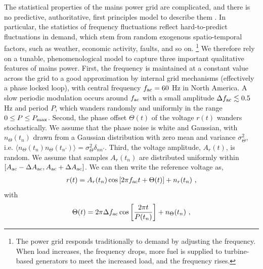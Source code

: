 \documentclass[pra,superscriptaddress,reprint,amsmath,amssymb,nofootinbib]{revtex4-2}
\begin{document}
 The statistical properties of the mains power grid are complicated, and there is no predictive, authoritative, first principles model to describe them \cite{888ed69a34a94bd1bdcb5073edcdd3fa,8571793}. In particular, the statistics of frequency fluctuations reflect hard-to-predict fluctuations in demand, which stem from random exogenous spatio-temporal factors, such as weather, economic activity, faults, and so on. \footnote{The power grid responds traditionally to demand by adjusting the frequency. When load increases, the frequency drops, more fuel is supplied to turbine-based generators to meet the increased load, and the frequency rises.} We therefore rely on a tunable, phenomenological model to capture three important qualitative features of mains power. First, the frequency is maintained at a constant value across the grid to a good approximation by internal grid mechanisms (effectively a phase locked loop), with central frequency $f_{\rm ac} = 60$ Hz in North America. A slow periodic modulation occurs around $f_{\rm ac}$ with a small amplitude $\Delta f_{\rm ac} \lesssim 0.5$ Hz and period $P$, which wanders randomly and uniformly in the range $0 \leq P \leq P_{\rm max}$. Second, the phase offset $\Theta(t)$ of the voltage $r(t)$ wanders stochastically. We assume that the phase noise is white and Gaussian, with $n_{\Theta}(t_n)$ drawn from a Gaussian distribution with zero mean and variance $\sigma_{\Theta}^2$, i.e. $\langle n_{\Theta} (t_n) n_{\Theta} (t_{n'})\rangle = \sigma^2_{\Theta} \delta_{n n'}$. Third, the voltage amplitude, $A_r(t)$, is random. We assume that samples $A_r(t_n)$ are distributed uniformly within $[A_{\rm ac} - \Delta A_{\rm ac} , A_{\rm ac} + \Delta A_{\rm ac}]$. We can then write the reference voltage as,
 \begin{eqnarray}
 	r(t) = A_r(t_n) \cos \left[ 2 \pi f_{\rm ac} t + \Theta(t)\right] +n_r(t_n) \ ,
 	\label{eq:voltage}
 \end{eqnarray}
with
 \begin{eqnarray}
\Theta(t) = 2 \pi \Delta f_{\rm ac} \cos\left[\frac{2 \pi t}{P(t_n)}\right] + n_{\Theta} (t_n) \ ,
\label{eq:voltage_theta}
\end{eqnarray}
\end{document}
